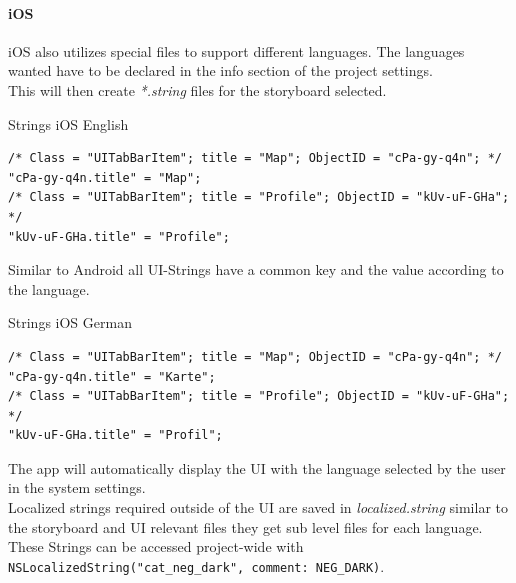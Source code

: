 \paragraph{iOS}
iOS also utilizes special files to support different languages. The languages wanted have to be declared in the info section of the project settings.\\
This will then create \textit{*.string} files for the storyboard selected.\\
\begin{listing}[H]
  \caption{Strings iOS English}
  \label{mint:strings_ios_eng}
    \begin{verbatim}
/* Class = "UITabBarItem"; title = "Map"; ObjectID = "cPa-gy-q4n"; */
"cPa-gy-q4n.title" = "Map";
/* Class = "UITabBarItem"; title = "Profile"; ObjectID = "kUv-uF-GHa"; */
"kUv-uF-GHa.title" = "Profile";
    \end{verbatim}
\end{listing}

Similar to Android all UI-Strings have a common key and the value according to the language.
\begin{listing}[H]
  \caption{Strings iOS German}
  \label{mint:strings_ios_ger}
    \begin{verbatim}
/* Class = "UITabBarItem"; title = "Map"; ObjectID = "cPa-gy-q4n"; */
"cPa-gy-q4n.title" = "Karte";
/* Class = "UITabBarItem"; title = "Profile"; ObjectID = "kUv-uF-GHa"; */
"kUv-uF-GHa.title" = "Profil";
    \end{verbatim}
\end{listing}

The app will automatically display the UI with the language selected by the user in the system settings.\\
Localized strings required outside of the UI are saved in \textit{localized.string} similar to the storyboard and UI relevant files they get sub level files for each language. These Strings can be accessed project-wide with \texttt{NSLocalizedString("cat_neg_dark", comment: NEG_DARK)}.
